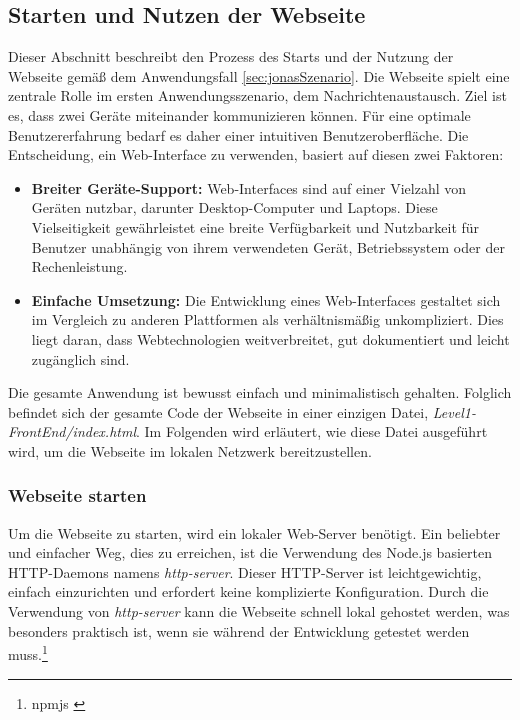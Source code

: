 \subsection{Starten und Nutzen der Webseite}
Dieser Abschnitt beschreibt den Prozess des Starts und der Nutzung der Webseite gemäß dem Anwendungsfall \ref{sec:jonasSzenario}. Die Webseite spielt eine zentrale Rolle im ersten Anwendungsszenario, dem Nachrichtenaustausch. Ziel ist es, dass zwei Geräte miteinander kommunizieren können. Für eine optimale Benutzererfahrung bedarf es daher einer intuitiven Benutzeroberfläche. Die Entscheidung, ein Web-Interface zu verwenden, basiert auf diesen zwei Faktoren:

\begin{itemize}
\item \textbf{Breiter Geräte-Support:} Web-Interfaces sind auf einer Vielzahl von Geräten nutzbar, darunter Desktop-Computer und Laptops. Diese Vielseitigkeit gewährleistet eine breite Verfügbarkeit und Nutzbarkeit für Benutzer unabhängig von ihrem verwendeten Gerät, Betriebssystem oder der Rechenleistung.

\item \textbf{Einfache Umsetzung:} Die Entwicklung eines Web-Interfaces gestaltet sich im Vergleich zu anderen Plattformen als verhältnismäßig unkompliziert. Dies liegt daran, dass Webtechnologien weitverbreitet, gut dokumentiert und leicht zugänglich sind.
\end{itemize}

Die gesamte Anwendung ist bewusst einfach und minimalistisch gehalten. Folglich befindet sich der gesamte Code der Webseite in einer einzigen Datei, \textit{Level1-FrontEnd/index.html}. Im Folgenden wird erläutert, wie diese Datei ausgeführt wird, um die Webseite im lokalen Netzwerk bereitzustellen.

\subsubsection{Webseite starten}

Um die Webseite zu starten, wird ein lokaler Web-Server benötigt. Ein beliebter und einfacher Weg, dies zu erreichen, ist die Verwendung des Node.js basierten HTTP-Daemons namens \textit{http-server}. Dieser HTTP-Server ist leichtgewichtig, einfach einzurichten und erfordert keine komplizierte Konfiguration. Durch die Verwendung von \textit{http-server} kann die Webseite schnell lokal gehostet werden, was besonders praktisch ist, wenn sie während der Entwicklung getestet
werden muss.\footnote{npmjs \cite{http-server}}

